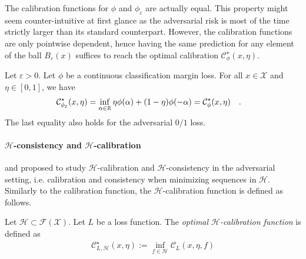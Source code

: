 The calibration functions for $\phi$ and $\phi_\varepsilon$ are actually equal. This property might seem counter-intuitive at first glance as the adversarial risk is most of the time strictly larger than its standard counterpart. However, the calibration functions are only pointwise dependent, hence having the same prediction for any element of the ball $B_\varepsilon(x)$ suffices to reach the optimal calibration $\mathcal{C}^\star_\phi(x,\eta)$.



\begin{prop}
\label{prop:calib-equality}
Let $\varepsilon>0$. Let $\phi$ be a continuous classification margin loss.  For all $x\in\mathcal{X}$ and $\eta\in[0,1]$, we have
\begin{align*}
    \mathcal{C}^\star_{\phi_\varepsilon}(x,\eta)&= \inf_{\alpha\in\mathbb{R}}\eta \phi(\alpha)+(1-\eta)\phi(-\alpha)
    =\mathcal{C}^\star_\phi(x,\eta)\quad.
\end{align*}
The last equality also holds for the adversarial $0/1$ loss.
\end{prop}

\paragraph{$\mathcal{H}$-consistency and  $\mathcal{H}$-calibration}
\citet{bao2020calibrated} and \citet{awasthi2021calibration,awasthi2021finer} proposed to study $\mathcal{H}$-calibration and $\mathcal{H}$-consistency in the adversarial setting, i.e. calibration and consistency when minimizing sequences in $\mathcal{H}$.  Similarly to the calibration function, the $\mathcal{H}$-calibration function is defined as follows.

\begin{definition}
    Let $\mathcal{H}\subset \mathcal{F}(\mathcal{X})$. Let $L$ be a loss function. The \emph{optimal $\mathcal{H}$-calibration function} is defined as
    \begin{align*}
            \mathcal{C}^\star_{L,\mathcal{H}}(x,\eta):=\inf_{f\in\mathcal{H}}\mathcal{C}_L(x,\eta,f)
    \end{align*}
    
\end{definition}
    
